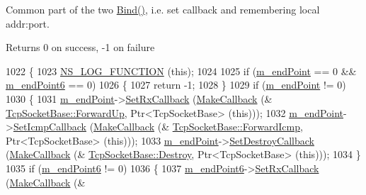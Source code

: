 Common part of the two \hyperlink{classns3_1_1TcpSocketBase_a7a9a87b74c1ce59ac89df8d9221681dd}{Bind()}, i.\+e. set callback and remembering local addr\+:port. 

\begin{DoxyReturn}{Returns}
0 on success, -\/1 on failure 
\end{DoxyReturn}

\begin{DoxyCode}
1022 \{
1023   \hyperlink{log-macros-disabled_8h_a90b90d5bad1f39cb1b64923ea94c0761}{NS\_LOG\_FUNCTION} (\textcolor{keyword}{this});
1024 
1025   \textcolor{keywordflow}{if} (\hyperlink{classns3_1_1TcpSocketBase_a78a4181c0a7394749110ea6b194de467}{m\_endPoint} == 0 && \hyperlink{classns3_1_1TcpSocketBase_ab4b114c3959ee672b4fc9b7a90540dba}{m\_endPoint6} == 0)
1026     \{
1027       \textcolor{keywordflow}{return} -1;
1028     \}
1029   \textcolor{keywordflow}{if} (\hyperlink{classns3_1_1TcpSocketBase_a78a4181c0a7394749110ea6b194de467}{m\_endPoint} != 0)
1030     \{
1031       \hyperlink{classns3_1_1TcpSocketBase_a78a4181c0a7394749110ea6b194de467}{m\_endPoint}->\hyperlink{classns3_1_1Ipv4EndPoint_abf5a10aadc249f2ce275cad9bb26322d}{SetRxCallback} (\hyperlink{group__makecallbackmemptr_ga9376283685aa99d204048d6a4b7610a4}{MakeCallback} (&
      \hyperlink{classns3_1_1TcpSocketBase_a2ebbcb9713facc9481341fcd972cdd82}{TcpSocketBase::ForwardUp}, Ptr<TcpSocketBase> (\textcolor{keyword}{this})));
1032       \hyperlink{classns3_1_1TcpSocketBase_a78a4181c0a7394749110ea6b194de467}{m\_endPoint}->\hyperlink{classns3_1_1Ipv4EndPoint_a96d3a484480565a8f7444eae41caa4b4}{SetIcmpCallback} (\hyperlink{group__makecallbackmemptr_ga9376283685aa99d204048d6a4b7610a4}{MakeCallback} (&
      \hyperlink{classns3_1_1TcpSocketBase_ad4887f46646734366ae435dbca13e3fd}{TcpSocketBase::ForwardIcmp}, Ptr<TcpSocketBase> (\textcolor{keyword}{this})));
1033       \hyperlink{classns3_1_1TcpSocketBase_a78a4181c0a7394749110ea6b194de467}{m\_endPoint}->\hyperlink{classns3_1_1Ipv4EndPoint_a19ec16d98c501d3684e6549d7296ea0a}{SetDestroyCallback} (\hyperlink{group__makecallbackmemptr_ga9376283685aa99d204048d6a4b7610a4}{MakeCallback} (&
      \hyperlink{classns3_1_1TcpSocketBase_aa0171ac255369c09a30144b1a5f6b21d}{TcpSocketBase::Destroy}, Ptr<TcpSocketBase> (\textcolor{keyword}{this})));
1034     \}
1035   \textcolor{keywordflow}{if} (\hyperlink{classns3_1_1TcpSocketBase_ab4b114c3959ee672b4fc9b7a90540dba}{m\_endPoint6} != 0)
1036     \{
1037       \hyperlink{classns3_1_1TcpSocketBase_ab4b114c3959ee672b4fc9b7a90540dba}{m\_endPoint6}->\hyperlink{classns3_1_1Ipv6EndPoint_adec9357acb2821c4bba0222bcc5638f1}{SetRxCallback} (\hyperlink{group__makecallbackmemptr_ga9376283685aa99d204048d6a4b7610a4}{MakeCallback} (&

\end{DoxyCode}
